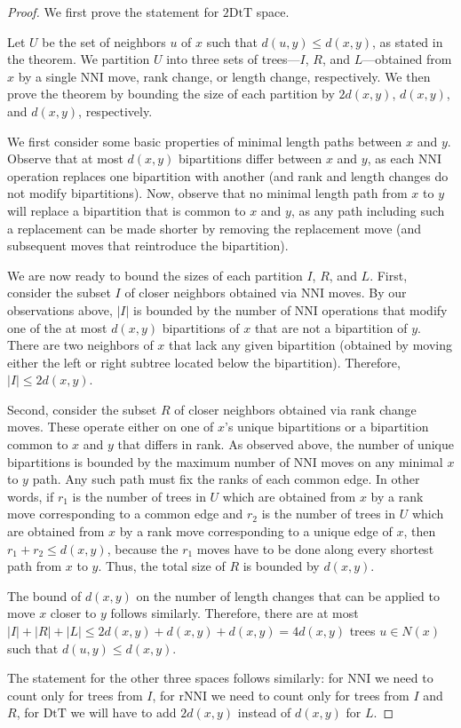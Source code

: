 \documentclass{amsart}
\theoremstyle{definition}
\newcommand{\dts}{\mathrm{2DtT}}
\newcommand{\nni}{\mathrm{NNI}}
\newcommand{\rnni}{\mathrm{rNNI}}
\newcommand{\dtt}{\mathrm{DtT}}
\begin{document}
\begin{proof}
We first prove the statement for $\dts$ space.

Let $U$ be the set of neighbors $u$ of $x$ such that $d(u,y) \le d(x,y)$, as stated in the theorem.
We partition $U$ into three sets of trees---$I$, $R$, and $L$---obtained from $x$ by a single NNI move, rank change, or length change, respectively.
We then prove the theorem by bounding the size of each partition by $2d(x,y)$, $d(x,y)$, and $d(x,y)$, respectively.

We first consider some basic properties of minimal length paths between $x$ and $y$.
Observe that at most $d(x,y)$ bipartitions differ between $x$ and $y$, as each NNI operation replaces one bipartition with another (and rank and length changes do not modify bipartitions).
Now, observe that no minimal length path from $x$ to $y$ will replace a bipartition that is common to $x$ and $y$, as any path including such a replacement can be made shorter by removing the replacement move (and subsequent moves that reintroduce the bipartition).

We are now ready to bound the sizes of each partition $I$, $R$, and $L$.
First, consider the subset $I$ of closer neighbors obtained via NNI moves.
By our observations above, $|I|$ is bounded by the number of NNI operations that modify one of the at most $d(x,y)$ bipartitions of $x$ that are not a bipartition of $y$.
There are two neighbors of $x$ that lack any given bipartition (obtained by moving either the left or right subtree located below the bipartition).
Therefore, $|I| \le 2d(x,y)$.

Second, consider the subset $R$ of closer neighbors obtained via rank change moves.
These operate either on one of $x$'s unique bipartitions or a bipartition common to $x$ and $y$ that differs in rank.
As observed above, the number of unique bipartitions is bounded by the maximum number of NNI moves on any minimal $x$ to $y$ path.
Any such path must fix the ranks of each common edge.
In other words, if $r_1$ is the number of trees in $U$ which are obtained from $x$ by a rank move corresponding to a common edge and $r_2$ is the number of trees in $U$ which are obtained from $x$ by a rank move corresponding to a unique edge of $x$, then $r_1 + r_2 \leq d(x,y)$, because the $r_1$ moves have to be done along every shortest path from $x$ to $y$.
Thus, the total size of $R$ is bounded by $d(x,y)$.

The bound of $d(x,y)$ on the number of length changes that can be applied to move $x$ closer to $y$ follows similarly.
Therefore, there are at most $|I| + |R| + |L| \le 2d(x,y) + d(x,y) + d(x,y) = 4d(x,y)$ trees $u \in N(x)$ such that $d(u, y) \le d(x, y)$.

The statement for the other three spaces follows similarly: for $\nni$ we need to count only for trees from $I$, for $\rnni$ we need to count only for trees from $I$ and $R$, for $\dtt$ we will have to add $2d(x,y)$ instead of $d(x,y)$ for $L$.
\end{proof}
\end{document}
